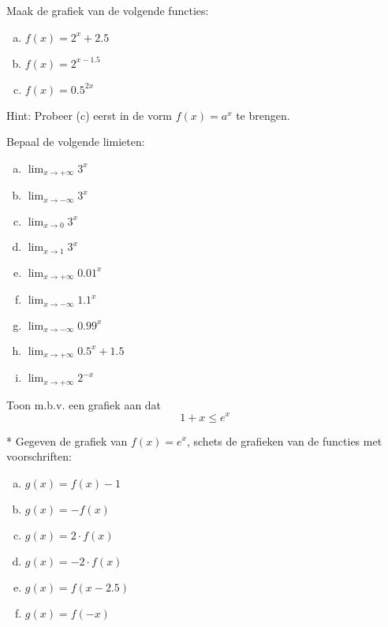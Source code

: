 \documentclass[12pt,twoside]{article}
\begin{document}
\begin{oefening}
Maak de grafiek van de volgende functies:
\begin{multicols}{3}
\begin{enumerate}[(a)]
  \itemsep.5em
  \item $f(x)=2^x+2.5$
  \item $f(x)=2^{x-1.5}$
  \item $f(x)=0.5^{2x}$
\end{enumerate}
\end{multicols}
Hint: Probeer (c) eerst in de vorm $f(x)=a^x$ te brengen.
\end{oefening}

\begin{oefening}
Bepaal de volgende limieten:
\begin{multicols}{3}
\begin{enumerate}[(a)]
  \itemsep.5em
  \item $\displaystyle\lim_{x\to+\infty}3^x$
  \item $\displaystyle\lim_{x\to-\infty}3^x$
  \item $\displaystyle\lim_{x\to0}3^x$
  \item $\displaystyle\lim_{x\to1}3^x$
  \item $\displaystyle\lim_{x\to+\infty}0.01^x$
  \item $\displaystyle\lim_{x\to-\infty}1.1^x$
  \item $\displaystyle\lim_{x\to-\infty}0.99^x$
  \item $\displaystyle\lim_{x\to+\infty}0.5^x+1.5$
  \item $\displaystyle\lim_{x\to+\infty}2^{-x}$
\end{enumerate}
\end{multicols}
\end{oefening}

\begin{oefening}
  Toon m.b.v. een grafiek aan dat
  $$1+x \leq e^x$$
\end{oefening}

\begin{oefening}*
Gegeven de grafiek van $f(x)=e^x$, schets de grafieken van de functies met voorschriften:
\begin{multicols}{3}
\begin{enumerate}[(a)]
  \itemsep.5em
  \item $g(x)=f(x)-1$
  \item $g(x)=-f(x)$
  \item $g(x)=2\cdot f(x)$
  \item $g(x)=-2\cdot f(x)$
  \item $g(x)=f(x-2.5)$
  \item $g(x)=f(-x)$
\end{enumerate}
\end{multicols}
\end{oefening}
\end{document}

